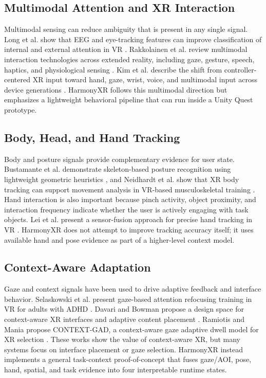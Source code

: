 \documentclass[conference]{IEEEtran}
\begin{document}
\subsection{Multimodal Attention and XR Interaction}
Multimodal sensing can reduce ambiguity that is present in any single signal. Long et al. show that EEG and eye-tracking features can improve classification of internal and external attention in VR \cite{long2024multimodal}. Rakkolainen et al. review multimodal interaction technologies across extended reality, including gaze, gesture, speech, haptics, and physiological sensing \cite{rakkolainen2021technologies}. Kim et al. describe the shift from controller-centered XR input toward hand, gaze, wrist, voice, and multimodal input across device generations \cite{kim2026controllers}. HarmonyXR follows this multimodal direction but emphasizes a lightweight behavioral pipeline that can run inside a Unity Quest prototype.

\subsection{Body, Head, and Hand Tracking}
Body and posture signals provide complementary evidence for user state. Bustamante et al. demonstrate skeleton-based posture recognition using lightweight geometric heuristics \cite{bustamante2025skeleton}, and Neidhardt et al. show that XR body tracking can support movement analysis in VR-based musculoskeletal training \cite{neidhardt2023body}. Hand interaction is also important because pinch activity, object proximity, and interaction frequency indicate whether the user is actively engaging with task objects. Lei et al. present a sensor-fusion approach for precise hand tracking in VR \cite{lei2023hand}. HarmonyXR does not attempt to improve tracking accuracy itself; it uses available hand and pose evidence as part of a higher-level context model.

\subsection{Context-Aware Adaptation}
Gaze and context signals have been used to drive adaptive feedback and interface behavior. Selaskowski et al. present gaze-based attention refocusing training in VR for adults with ADHD \cite{selaskowski2023gaze}. Davari and Bowman propose a design space for context-aware XR interfaces and adaptive content placement \cite{davari2024context}. Ramiotis and Mania propose CONTEXT-GAD, a context-aware gaze adaptive dwell model for XR selection \cite{ramiotis2025contextgad}. These works show the value of context-aware XR, but many systems focus on interface placement or gaze selection. HarmonyXR instead implements a general task-context proof-of-concept that fuses gaze/AOI, pose, hand, spatial, and task evidence into four interpretable runtime states.
\end{document}
